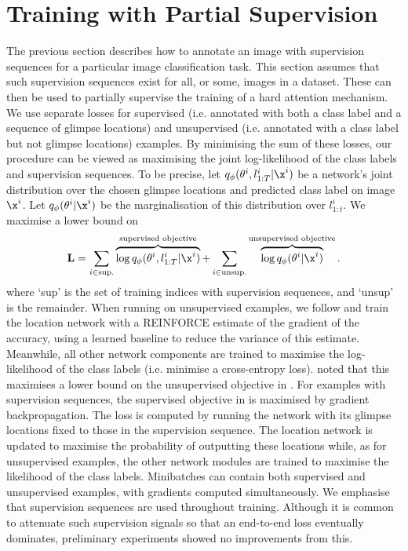 \section{Training with Partial Supervision} \label{sec:nogs-sup}
\label{sec:nogs-partially-supervised-training}
The previous section describes how to annotate an image with supervision
sequences for a particular image classification task. This section assumes that
such supervision sequences exist for all, or some, images in a dataset. These
can then be used to partially supervise the training of a hard attention
mechanism. We use separate losses for supervised (i.e. annotated with both a
class label and a sequence of glimpse locations) and unsupervised (i.e.
annotated with a class label but not glimpse locations) examples. By minimising
the sum of these losses, our procedure can be viewed as maximising the joint
log-likelihood of the class labels and supervision sequences. To be precise, let
$q_\phi (\theta^i, l_{1:T}^i | \x^i)$ be a network's joint distribution over the
chosen glimpse locations and predicted class label on image $\x^i$. Let $q_\phi
(\theta^i | \x^i)$ be the marginalisation of this distribution over $l^i_{1:t}$.
We maximise a lower bound on
\begin{equation}
  \label{eq:objective}
  \mathbf{L} = \sum_{i \in \text{sup.}} \overbrace{\log q_\phi (\theta^i, l_{1:T}^i | \x^i)}^{\text{supervised objective}} + \sum_{i \in \text{unsup.}} \overbrace{\log q_\phi (\theta^i | \x^i)}^{\text{unsupervised objective}}.
\end{equation}
where `sup' is the set of training indices with supervision sequences, and
`unsup' is the remainder. When running on unsupervised examples, we follow
\cite{mnih2014recurrent} and train the location network with a REINFORCE
estimate of the gradient of the accuracy, using a learned baseline to reduce the
variance of this estimate. Meanwhile, all other network components are trained
to maximise the log-likelihood of the class labels (i.e. minimise a
cross-entropy loss). \cite{ba2014multiple} noted that this maximises a lower
bound on the unsupervised objective in . For examples with
supervision sequences, the supervised objective in  is
maximised by gradient backpropagation. The loss is computed by running the
network with its glimpse locations fixed to those in the supervision sequence.
The location network is updated to maximise the probability of outputting these
locations while, as for unsupervised examples, the other network modules are
trained to maximise the likelihood of the class labels. Minibatches can contain
both supervised and unsupervised examples, with gradients computed
simultaneously. We emphasise that supervision sequences are used throughout
training. Although it is common to attenuate such supervision signals so that an
end-to-end loss eventually dominates, preliminary experiments showed no
improvements from this.

